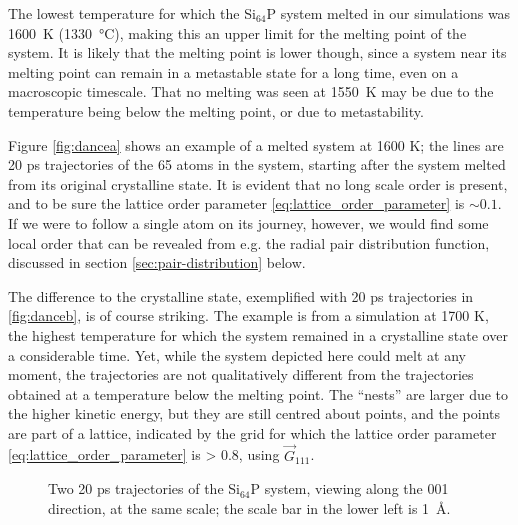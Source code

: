 \documentclass[11pt,bibliography=totoc,index=totoc]{scrbook}   %
\begin{document}
The lowest temperature for which the Si$_{64}$P system melted in our simulations was \SI{1600}{\kelvin} (\SI{1330}{\celsius}), making this an upper limit for the melting point of the system. 
It is likely that the melting point is lower though, since a system near its melting point can remain in a metastable state for a long time, even on a macroscopic timescale.
That no melting was seen at \SI{1550}{\kelvin} may be due to the temperature being below the melting point, or due to metastability.

Figure \ref{fig:dancea} shows an example of a melted system at 1600 K; the lines are 20 ps trajectories of the 65 atoms in the system, starting after the system melted from its original crystalline state. 
It is evident that no long scale order is present, and to be sure the lattice order parameter \eqref{eq:lattice_order_parameter} is $\sim 0.1$. If we were to follow a single atom on its journey, however, we would find some local order that can be revealed from e.g. the radial pair distribution function, discussed in section \ref{sec:pair-distribution} below.

The difference to the crystalline state, exemplified with 20 ps trajectories in \ref{fig:danceb}, is of course striking. 
The example is from a simulation at 1700 K, the highest temperature for which the system remained in a crystalline state over a considerable time.
Yet, while the system depicted here could melt at any moment, the trajectories are not qualitatively different from the trajectories obtained at a temperature below the melting point. The ``nests'' are larger due to the higher kinetic energy, but they are still centred about points, and the points are part of a lattice, indicated by the grid for which the lattice order parameter \eqref{eq:lattice_order_parameter} is > 0.8, using $\vec{G}_{111}$. 

\begin{figure}[htbp]
    \begin{center}
    \end{center}
    \caption{Two 20 ps trajectories of the Si$_{64}$P system, viewing along the 001 direction, at the same scale; the scale bar in the lower left is 1~Å.}
    \label{fig:dance}
\end{figure}
\end{document}
